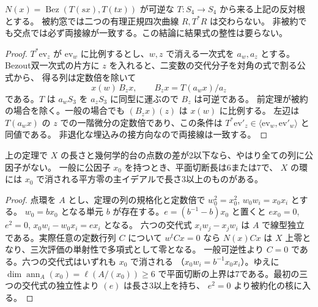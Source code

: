 \begin{corollary}\label{cor:bezout-contact-divisor}
$N(x)=\operatorname{Bez}(T(sx),T(tx))$ が可逆な $T:S_4\to S_4$ から来る上記の反対根とする。
被約窓では二つの有理正規四次曲線 $R,T^*R$ は交わらない。
非被約でも交点では必ず両接線が一致する。この結論に結果式の整性は要らない。
\end{corollary}
\begin{proof}
$T^*\mathrm{ev}_z$ が $\mathrm{ev}_w$ に比例するとし、$w,z$ で消える一次式を $a_w,a_z$ とする。
Bezout双一次式の片方に $z$ を入れると、二変数の交代分子を対角の式で割る公式から、
得る列は定数倍を除いて
\[
                   x(w)\,B_z x,\qquad B_z x=T(a_w x)/a_z
\]
である。$T$ は $a_w S_3$ を $a_z S_3$ に同型に運ぶので $B_z$ は可逆である。
前定理が被約の場合を除く。一般の場合でも $(B_z x)(z)$ は $x(w)$ に比例する。
左辺は $T(a_w x)$ の $z$ での一階微分の定数倍であり、この条件は
$T^*\mathrm{ev}'_z\in\langle\mathrm{ev}_w,\mathrm{ev}'_w\rangle$ と同値である。
非退化な埋込みの接方向なので両接線は一致する。
\end{proof}

\begin{proposition}\label{prop:opposite-column-nilpotent-length}
上の定理で $X$ の長さと幾何学的台の点数の差が2以下なら、やはり全ての列に公因子がない。
一般に公因子 $x_0$ を持つとき、平面切断長は6または7で、
$X$ の環には $x_0$ で消される平方零の主イデアルで長さ3以上のものがある。
\end{proposition}
\begin{proof}
点環を $A$ とし、定理の列の規格化と定数倍で $w_0^2=x_0^2$, $w_0 w_i=x_0 x_i$ とする。
$w_0=b x_0$ となる単元 $b$ が存在する。$e=(b^{-1}-b)x_0$ と置くと
$ex_0=0$, $e^2=0$, $x_0 w_i-w_0 x_i=e x_i$ となる。
六つの交代式 $x_iw_j-x_jw_i$ は $A$ で線型独立である。実際任意の定数行列 $C$ について
$w^t Cx=0$ なら $N(x)Cx$ は $X$ 上零となり、三次評価の単射性で多項式として零となる。
一般可逆性より $C=0$ である。六つの交代式はいずれも $x_0$ で消される
（$x_0 w_i=b^{-1} x_0 x_i$）。ゆえに $\dim\operatorname{ann}_A(x_0)=\ell(A/(x_0))\ge6$
で平面切断の上界は7である。最初の三つの交代式の独立性より $(e)$ は長さ3以上を持ち、
$e^2=0$ より被約化の核に入る。
\end{proof}


